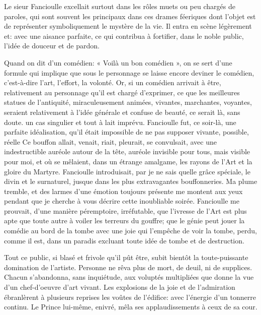 Le sieur Fancioulle excellait surtout dans les rôles muets ou peu
chargés de paroles, qui sont souvent les principaux dans ces drames
féeriques dont l’objet est de représenter
symboliquement le mystère de la vie. Il entra en scène légèrement et:
avec une aisance parfaite, ce qui contribua à fortifier, dans le noble
public, l’idée de douceur et de pardon.

Quand on dit d’un comédien: « Voilà un bon comédien »,
on se sert d’une formule qui implique que sous le
personnage se laisse encore deviner le comédien,
c’est{}-à{}-dire l’art,
l’effort, la volonté. Or, si un comédien arrivait à
être, relativement au personnage qu’il est chargé
d’exprimer, ce que les meilleures statues de
l’antiquité, miraculeusement animées, vivantes,
marchantes, voyantes, seraient relativement à l’idée
générale et confuse de beauté, ce serait là, sans doute. un cas
singulier et tout à lait imprévu. Fancioulle fut, ce soir{}-là, une
parfaite idéalisation, qu’il était impossible de ne
pas supposer vivante, possible, réelle Ce bouffon allait, venait,
riait, pleurait, se convulsait, avec une indestructible auréole autour
de la tête, auréole invisible pour tous, mais visible pour moi, et où
se mêlaient, dans un étrange amalgame, les rayons de
l’Art et la gloire du Martyre. Fancioulle
introduisait, par je ne sais quelle grâce spéciale, le divin et le
surnaturel, jusque dans les plus extravagantes bouffonneries. Ma plume
tremble, et des larmes d’une émotion toujours présente
me montent aux yeux pendant que je cherche à vous décrire cette
inoubliable soirée. Fancioulle me prouvait, d’une
manière péremptoire, irréfutable, que l’ivresse de
l’Art est plus apte que toute autre à voiler les
terreurs du gouffre; que le génie peut jouer la comédie au bord de la
tombe avec une joie qui l’empêche de voir la tombe,
perdu, comme il est, dans un paradis excluant toute idée de tombe et de
destruction.

Tout ce public, si blasé et frivole qu’il pût être,
subit bientôt la toute{}-puissante domination de
l’artiste. Personne ne rêva plus de mort, de deuil, ni
de supplices. Chacun s’abandonna, sans inquiétude, aux
voluptés multipliées que donne la vue d’un
chef{}-d’oeuvre d’art vivant. Les
explosions de la joie et de l’admiration ébranlèrent à
plusieurs reprises les voûtes de l’édifice: avec
l’énergie d’un tonnerre continu. Le
Prince lui{}-même, enivré, mêla ses applaudissements à ceux de sa cour.

